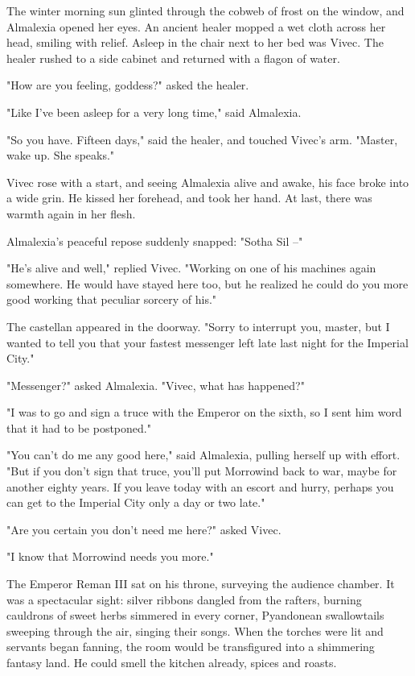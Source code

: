 \clearpage
{}

\dropcap The winter morning sun glinted through the cobweb of frost on the window, and Almalexia opened her eyes. An ancient healer mopped a wet cloth across her head, smiling with relief. Asleep in the chair next to her bed was Vivec. The healer rushed to a side cabinet and returned with a flagon of water.

"How are you feeling, goddess?" asked the healer.

"Like I've been asleep for a very long time," said Almalexia.

"So you have. Fifteen days," said the healer, and touched Vivec's arm. "Master, wake up. She speaks."

Vivec rose with a start, and seeing Almalexia alive and awake, his face broke into a wide grin. He kissed her forehead, and took her hand. At last, there was warmth again in her flesh.

Almalexia's peaceful repose suddenly snapped: "Sotha Sil --"

"He's alive and well," replied Vivec. "Working on one of his machines again somewhere. He would have stayed here too, but he realized he could do you more good working that peculiar sorcery of his."

The castellan appeared in the doorway. "Sorry to interrupt you, master, but I wanted to tell you that your fastest messenger left late last night for the Imperial City."

"Messenger?" asked Almalexia. "Vivec, what has happened?"

"I was to go and sign a truce with the Emperor on the sixth, so I sent him word that it had to be postponed."

"You can't do me any good here," said Almalexia, pulling herself up with effort. "But if you don't sign that truce, you'll put Morrowind back to war, maybe for another eighty years. If you leave today with an escort and hurry, perhaps you can get to the Imperial City only a day or two late."

"Are you certain you don't need me here?" asked Vivec.

"I know that Morrowind needs you more."

The Emperor Reman III sat on his throne, surveying the audience chamber. It was a spectacular sight: silver ribbons dangled from the rafters, burning cauldrons of sweet herbs simmered in every corner, Pyandonean swallowtails sweeping through the air, singing their songs. When the torches were lit and servants began fanning, the room would be transfigured into a shimmering fantasy land. He could smell the kitchen already, spices and roasts.

